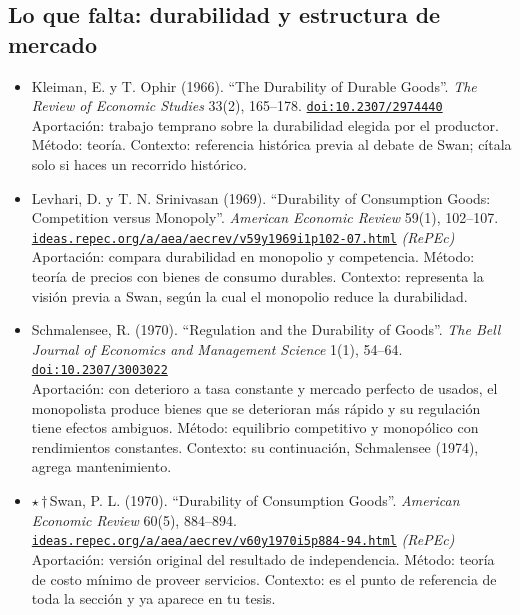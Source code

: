\documentclass[11pt]{article}
\begin{document}
\subsection*{Lo que falta: durabilidad y estructura de mercado}
\begin{itemize}
\item Kleiman, E. y T. Ophir (1966). ``The Durability of Durable Goods''. \textit{The Review of Economic Studies} 33(2), 165--178. \href{https://doi.org/10.2307/2974440}{\texttt{doi:10.2307/2974440}}\\
Aportación: trabajo temprano sobre la durabilidad elegida por el productor. Método: teoría. Contexto: referencia histórica previa al debate de Swan; cítala solo si haces un recorrido histórico.
\item Levhari, D. y T. N. Srinivasan (1969). ``Durability of Consumption Goods: Competition versus Monopoly''. \textit{American Economic Review} 59(1), 102--107. \href{https://ideas.repec.org/a/aea/aecrev/v59y1969i1p102-07.html}{\texttt{ideas.repec.org/a/aea/aecrev/v59y1969i1p102-07.html}} \textit{(RePEc)}\\
Aportación: compara durabilidad en monopolio y competencia. Método: teoría de precios con bienes de consumo durables. Contexto: representa la visión previa a Swan, según la cual el monopolio reduce la durabilidad.
\item Schmalensee, R. (1970). ``Regulation and the Durability of Goods''. \textit{The Bell Journal of Economics and Management Science} 1(1), 54--64. \href{https://doi.org/10.2307/3003022}{\texttt{doi:10.2307/3003022}}\\
Aportación: con deterioro a tasa constante y mercado perfecto de usados, el monopolista produce bienes que se deterioran más rápido y su regulación tiene efectos ambiguos. Método: equilibrio competitivo y monopólico con rendimientos constantes. Contexto: su continuación, Schmalensee (1974), agrega mantenimiento.
\item $\star$\,$\dagger$\,Swan, P. L. (1970). ``Durability of Consumption Goods''. \textit{American Economic Review} 60(5), 884--894. \href{https://ideas.repec.org/a/aea/aecrev/v60y1970i5p884-94.html}{\texttt{ideas.repec.org/a/aea/aecrev/v60y1970i5p884-94.html}} \textit{(RePEc)}\\
Aportación: versión original del resultado de independencia. Método: teoría de costo mínimo de proveer servicios. Contexto: es el punto de referencia de toda la sección y ya aparece en tu tesis.

\end{itemize}
\end{document}
